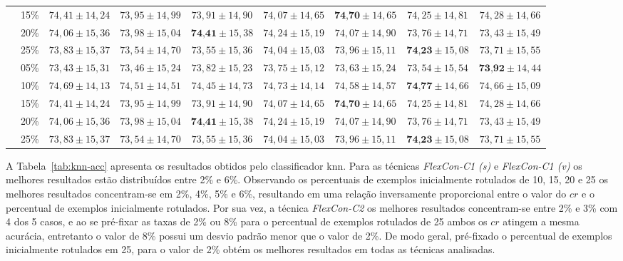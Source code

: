\begin{table}[h]
{\begin{tabular}{|c|c|c|c|c|c|c|c|c|}
                 & 15\% & $74,41 \pm 14,24$ & $73,95 \pm 14,99$ & $73,91 \pm 14,90$ & $74,07 \pm 14,65$ & $\textbf{74,70} \pm 14,65$ & $74,25 \pm 14,81$ & $74,28 \pm 14,66$ \\
                 & 20\% & $74,06 \pm 15,36$ & $73,98 \pm 15,04$ & $\textbf{74,41} \pm 15,38$ & $74,24 \pm 15,19$ & $74,07 \pm 14,90$ & $73,76 \pm 14,71$ & $73,43 \pm 15,49$ \\
                 & 25\% & $73,83 \pm 15,37$ & $73,54 \pm 14,70$ & $73,55 \pm 15,36$ & $74,04 \pm 15,03$ & $73,96 \pm 15,11$ & $\textbf{74,23} \pm 15,08$ & $73,71 \pm 15,55$ \\ \hline
                \parbox[t]{3mm}{}
                 & 05\% & $73,43 \pm 15,31$ & $73,46 \pm 15,24$ & $73,82 \pm 15,23$ & $73,75 \pm 15,12$ & $73,63 \pm 15,24$ & $73,54 \pm 15,54$ & $\textbf{73,92} \pm 14,44$ \\
                 & 10\% & $74,69 \pm 14,13$ & $74,51 \pm 14,51$ & $74,45 \pm 14,73$ & $74,73 \pm 14,14$ & $74,58 \pm 14,57$ & $\textbf{74,77} \pm 14,66$ & $74,66 \pm 15,09$ \\
                 & 15\% & $74,41 \pm 14,24$ & $73,95 \pm 14,99$ & $73,91 \pm 14,90$ & $74,07 \pm 14,65$ & $\textbf{74,70} \pm 14,65$ & $74,25 \pm 14,81$ & $74,28 \pm 14,66$ \\
                 & 20\% & $74,06 \pm 15,36$ & $73,98 \pm 15,04$ & $\textbf{74,41} \pm 15,38$ & $74,24 \pm 15,19$ & $74,07 \pm 14,90$ & $73,76 \pm 14,71$ & $73,43 \pm 15,49$ \\
                 & 25\% & $73,83 \pm 15,37$ & $73,54 \pm 14,70$ & $73,55 \pm 15,36$ & $74,04 \pm 15,03$ & $73,96 \pm 15,11$ & $\textbf{74,23} \pm 15,08$ & $73,71 \pm 15,55$ \\ \hline
            \end{tabular}%
        }
        \label{tab:ripper-acc}
    \end{table}
    
    A Tabela~\ref{tab:knn-acc} apresenta os resultados obtidos pelo classificador \ac{knn}. Para as técnicas \textit{FlexCon\hyp{C1} (s)} e \textit{FlexCon\hyp{C1} (v)} os melhores resultados estão distribuídos entre 2\% e 6\%. Observando os percentuais de exemplos inicialmente rotulados de 10, 15, 20 e 25 os melhores resultados concentram\hyp{se} em 2\%, 4\%, 5\% e 6\%, resultando em uma relação inversamente proporcional entre o valor do $cr$ e o percentual de exemplos inicialmente rotulados. Por sua vez, a técnica \textit{FlexCon\hyp{C2}} os melhores resultados concentram\hyp{se} entre 2\% e 3\% com 4 dos 5 casos, e ao se pré\hyp{fixar} as taxas de 2\% ou 8\% para o percentual de exemplos rotulados de 25 ambos os $cr$ atingem a mesma acurácia, entretanto o valor de 8\% possui um desvio padrão menor que o valor de 2\%. De modo geral, pré\hyp{fixado} o percentual de exemplos inicialmente rotulados em 25, para o valor de 2\% obtém os melhores resultados em todas as técnicas analisadas.
    
